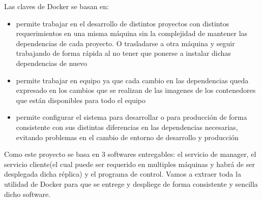 Las claves de Docker se basan en:
\begin{itemize}
    \item permite trabajar en el desarrollo de distintos proyectos con distintos requerimientos en una misma máquina sin la complejidad de mantener las dependencias de cada proyecto. O trasladarse a otra máquina y seguir trabajando de forma rápida al no tener que ponerse a instalar dichas dependencias de nuevo
    \item permite trabajar en equipo ya que cada cambio en las dependencias queda expresado en los cambios que se realizan de las imagenes de los contenedores que están disponibles para todo el equipo
    \item permite configurar el sistema para desarrollar o para producción de forma consistente con sus distintas diferencias en las dependencias necesarias, evitando problemas en el cambio de entorno de desarrollo y producción
\end{itemize}

Como este proyecto se basa en 3 softwares entregables: el servicio de manager, el servicio cliente(el cual puede ser requerido en multiples máquinas y habrá de ser desplegada dicha réplica) y el programa de control. Vamos a extraer toda la utilidad de Docker para que se entrege y despliege de forma consistente y sencilla dicho software.


%
%
